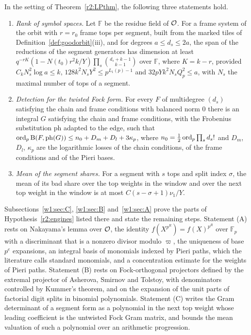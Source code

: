 \begin{hypothesis}\label{r2:engines}
In the setting of Theorem~\ref{r2:LPthm}, the following three statements hold.
\begin{enumerate}
\item[(A)] \emph{Rank of symbol spaces.} Let $\mathbb F$ be the residue field of $\mathcal O$. For a frame system of the orbit with $r=r_0$ frame tops per segment, built from the marked tiles of Definition~\ref{def:goodorbit}(iii), and for degrees $a\le d_s\le2a$, the span of the reductions of the segment generators has dimension at least $q^{-rK}(1-N(t_0)r^2k/Y)\prod_s\binom{d_s+k-1}{k-1}$ over $\mathbb F$, where $K=k-r$, provided $C_kN_s^2\log a\le k$, $128k^2N_sY^2\le p^{L_1(p)-1}$ and $32pYk^2N_sQ_p^2\le a$, with $N_s$ the maximal number of tops of a segment.
\item[(B)] \emph{Detection for the twisted Fock form.} For every $F$ of multidegree $(d_s)$ satisfying the chain and frame conditions with balanced norm $0$ there is an integral $G$ satisfying the chain and frame conditions, with the Frobenius substitution $\mathrm{ph}$ adapted to the edge, such that $\operatorname{ord}_p\mathrm B(F,\mathrm{ph}(G))\le n_0+D_m+D_l+3\kappa_p$, where $n_0=\frac12\operatorname{ord}_p\prod_sd_s!$ and $D_m$, $D_l$, $\kappa_p$ are the logarithmic losses of the chain conditions, of the frame conditions and of the Pieri bases.
\item[(C)] \emph{Mean of the segment shares.} For a segment with $s$ tops and split index $\sigma$, the mean of its bad share over the top weights in the window and over the next top weight in the window is at most $C(s-\sigma+1)\nu_1/Y$.
\end{enumerate}
\end{hypothesis}

Subsections~\ref{w1:sec:C}, \ref{w1:sec:B} and~\ref{w1:sec:A} prove the parts of Hypothesis~\ref{r2:engines} listed there and state the remaining steps.  Statement (A) rests on Nakayama's lemma over $\mathcal O$, the identity $f(X^{p^R})=f(X)^{p^R}$ over $\mathbb F_p$ with a discriminant that is a nonzero divisor modulo $\varpi$, the uniqueness of base $p^e$ expansions, an integral basis of monomials indexed by Pieri paths, which the literature calls standard monomials, and a concentration estimate for the weights of Pieri paths. Statement (B) rests on Fock-orthogonal projectors defined by the extremal projector of Asherova, Smirnov and Tolstoy, with denominators controlled by Kummer's theorem, and on the expansion of the unit parts of factorial digit splits in binomial polynomials. Statement (C) writes the Gram determinant of a segment form as a polynomial in the next top weight whose leading coefficient is the untwisted Fock Gram matrix, and bounds the mean valuation of such a polynomial over an arithmetic progression.

